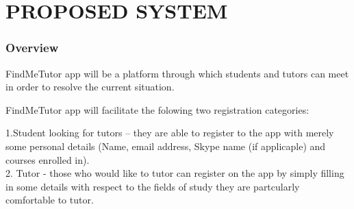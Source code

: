 \documentclass[12pt]{article}
\begin{document}
\section{PROPOSED SYSTEM}
\subsubsection{Overview}
\begin{flushleft}
FindMeTutor app will be a platform through which students and tutors can meet in order to resolve the current situation. 
\end{flushleft}
\begin{flushleft}
FindMeTutor app will facilitate the folowing two registration categories: 

\begin{flushleft}
1.Student looking for tutors – they are able to  register to the app with merely some personal details (Name, email address, Skype name (if applicaple) and courses enrolled in).\\
2. Tutor - those who would like to tutor can register on the app by simply filling in some details with respect to the fields of study they are partcularly comfortable to tutor.\\
\end{flushleft}
\end{flushleft}
\end{document}
